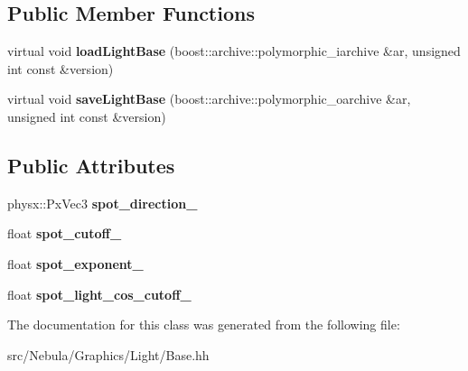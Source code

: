 \subsection*{Public Member Functions}
\begin{DoxyCompactItemize}
\item 
\hypertarget{classNeb_1_1Light_1_1Spot_af9b351cb8e7216e6fec3bcda3b0fc555}{virtual void {\bfseries load\-Light\-Base} (boost\-::archive\-::polymorphic\-\_\-iarchive \&ar, unsigned int const \&version)}\label{classNeb_1_1Light_1_1Spot_af9b351cb8e7216e6fec3bcda3b0fc555}

\item 
\hypertarget{classNeb_1_1Light_1_1Spot_a0b84b8454478e83bf35974c057a7ba34}{virtual void {\bfseries save\-Light\-Base} (boost\-::archive\-::polymorphic\-\_\-oarchive \&ar, unsigned int const \&version)}\label{classNeb_1_1Light_1_1Spot_a0b84b8454478e83bf35974c057a7ba34}

\end{DoxyCompactItemize}
\subsection*{Public Attributes}
\begin{DoxyCompactItemize}
\item 
\hypertarget{classNeb_1_1Light_1_1Spot_a7ec5b15e3811a108228fccbd9c607523}{physx\-::\-Px\-Vec3 {\bfseries spot\-\_\-direction\-\_\-}}\label{classNeb_1_1Light_1_1Spot_a7ec5b15e3811a108228fccbd9c607523}

\item 
\hypertarget{classNeb_1_1Light_1_1Spot_a72b93fdb19cb465f855978d10984a659}{float {\bfseries spot\-\_\-cutoff\-\_\-}}\label{classNeb_1_1Light_1_1Spot_a72b93fdb19cb465f855978d10984a659}

\item 
\hypertarget{classNeb_1_1Light_1_1Spot_ac879c3a4975b5522b17984bb1c60a04b}{float {\bfseries spot\-\_\-exponent\-\_\-}}\label{classNeb_1_1Light_1_1Spot_ac879c3a4975b5522b17984bb1c60a04b}

\item 
\hypertarget{classNeb_1_1Light_1_1Spot_aa95ba64ea7c38418312711a335202f5a}{float {\bfseries spot\-\_\-light\-\_\-cos\-\_\-cutoff\-\_\-}}\label{classNeb_1_1Light_1_1Spot_aa95ba64ea7c38418312711a335202f5a}

\end{DoxyCompactItemize}


The documentation for this class was generated from the following file\-:\begin{DoxyCompactItemize}
\item 
src/\-Nebula/\-Graphics/\-Light/Base.\-hh\end{DoxyCompactItemize}
